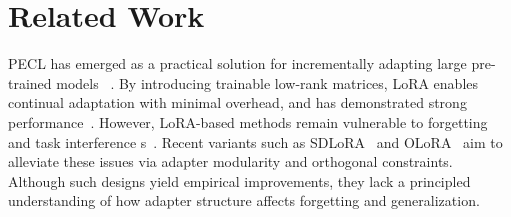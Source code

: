 \documentclass{article}
\newcommand{\minisection}[1]{\vspace{0.0in} \noindent {\bf #1}}
\theoremstyle{plain}
\theoremstyle{definition}
\theoremstyle{remark}
\begin{document}
\begin{itemize}



\end{itemize}

\section{Related Work}

\minisection{LoRA-Based CL.}
PECL has emerged as a practical solution for incrementally adapting large pre-trained models
~\cite{pmlr-v97-houlsby19a,Wang_2022_CVPR,dingParameterefficientFinetuningLargescale2023,xu2023parameterefficientfinetuningmethodspretrained}. By introducing trainable low-rank matrices, LoRA enables continual adaptation with minimal overhead, and has demonstrated strong performance~\cite{hu2022lora}.
However, LoRA-based methods remain vulnerable to forgetting and task interference
s~\cite{Gao_2023_ICCV,10.1145/3730436.3730456,yang2024parametercollisionhinderingcontinual}. 
Recent variants such as SDLoRA~\cite{wu2025sdlorascalabledecoupledlowrank} and OLoRA~\cite{NEURIPS2020_70d85f35,wang2023orthogonal} aim to alleviate these issues via adapter modularity and orthogonal constraints. 
Although such designs yield empirical improvements, they lack a principled understanding of how adapter structure affects forgetting and generalization.
\end{document}
